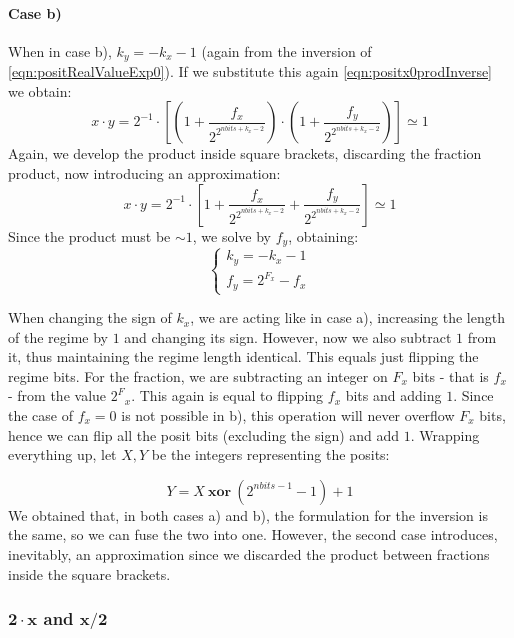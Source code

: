 \paragraph{Case b)} When in case b), $k_y = -k_x - 1$ (again from the inversion of \eqref{eqn:positRealValueExp0}). If we substitute this again \eqref{eqn:positx0prodInverse} we obtain:
\begin{equation}
    x \cdot y = 2^{-1} \cdot \left[ \left (1 + \frac{f_x}{2^{2^{nbits + k_x - 2}}} \right ) \cdot \left (1 + \frac{f_y}{2^{2^{nbits + k_x - 2}}} \right ) \right] \simeq 1
\end{equation}
Again, we develop the product inside square brackets, discarding the fraction product, now introducing an approximation:
\begin{equation}
    x \cdot y = 2^{-1} \cdot \left[ 1 + \frac{f_x}{2^{2^{nbits + k_x - 2}}}  + \frac{f_y}{2^{2^{nbits + k_x - 2}}} \right] \simeq 1
\end{equation}
Since the product must be $\sim 1$, we solve by $f_y$, obtaining:
\begin{equation}
\left\{\begin{matrix}
k_y = -k_x - 1 \\
f_y = 2^{F_x} - f_x
\end{matrix}\right.
\end{equation}

When changing the sign of $k_x$, we are acting like in case a), increasing the length of the regime by $1$ and changing its sign. However, now we also subtract $1$ from it, thus maintaining the regime length identical. This equals just flipping the regime bits.  For the fraction, we are subtracting an integer on $F_x$ bits - that is $f_x$ - from the value $2^F{_x}$. This again is equal to flipping $f_x$ bits and adding $1$. Since the case of $f_x = 0$ is not possible in b), this operation will never overflow $F_x$ bits, hence we can flip all the posit bits (excluding the sign) and add $1$. Wrapping everything up, let $X,Y$ be the integers representing the posits:

\begin{equation}
    Y = X\ \mathbf{xor}\ (2^{nbits - 1} - 1) + 1
\end{equation}
We obtained that, in both cases a) and b), the formulation for the inversion is the same, so we can fuse the two into one. However, the second case introduces, inevitably, an approximation since we discarded the product between fractions inside the square brackets.

\subsubsection{$\mathbf{2\cdot x}$ and $\mathbf{x/2}$}

